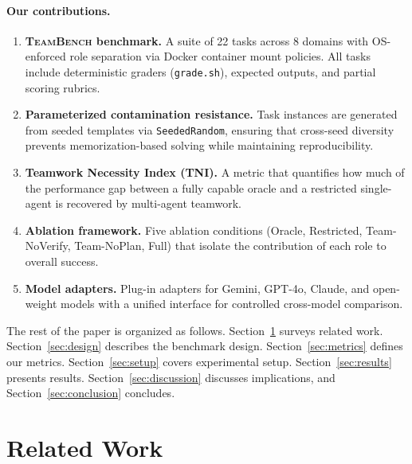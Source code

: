 \documentclass{article}
\newcommand{\teambench}{\textsc{TeamBench}}
\newcommand{\sys}[1]{\texttt{#1}}
\begin{document}
\paragraph{Our contributions.}
\begin{enumerate}[label=\textbf{C\arabic*.}, leftmargin=2em]
  \item \textbf{\teambench{} benchmark.} A suite of 22 tasks across 8 domains
        with OS-enforced role separation via Docker container mount policies.
        All tasks include deterministic graders (\sys{grade.sh}), expected
        outputs, and partial scoring rubrics.

  \item \textbf{Parameterized contamination resistance.} Task instances are
        generated from seeded templates via \sys{SeededRandom}, ensuring that
        cross-seed diversity prevents memorization-based solving while
        maintaining reproducibility.

  \item \textbf{Teamwork Necessity Index (TNI).} A metric that quantifies
        how much of the performance gap between a fully capable oracle and a
        restricted single-agent is recovered by multi-agent teamwork.

  \item \textbf{Ablation framework.} Five ablation conditions (Oracle,
        Restricted, Team-NoVerify, Team-NoPlan, Full) that isolate the
        contribution of each role to overall success.

  \item \textbf{Model adapters.} Plug-in adapters for Gemini, GPT-4o,
        Claude, and open-weight models with a unified interface for controlled
        cross-model comparison.
\end{enumerate}

The rest of the paper is organized as follows. Section~\ref{sec:related}
surveys related work. Section~\ref{sec:design} describes the benchmark
design. Section~\ref{sec:metrics} defines our metrics. Section~\ref{sec:setup}
covers experimental setup. Section~\ref{sec:results} presents results.
Section~\ref{sec:discussion} discusses implications, and
Section~\ref{sec:conclusion} concludes.

\section{Related Work}
\label{sec:related}
\end{document}
